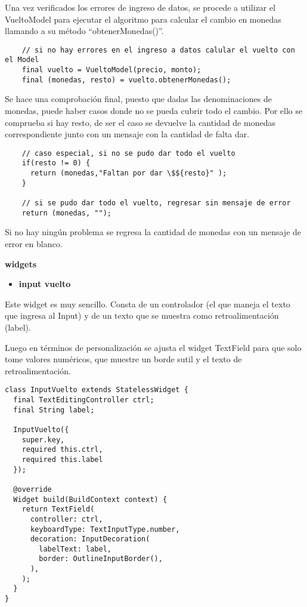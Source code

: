 Una vez verificados los errores de ingreso de datos, se procede a utilizar el VueltoModel para ejecutar el algoritmo para calcular el cambio en monedas llamando a su método “obtenerMonedas()”.

\begin{center}
\begin{lstlisting}
    // si no hay errores en el ingreso a datos calular el vuelto con el Model
    final vuelto = VueltoModel(precio, monto);
    final (monedas, resto) = vuelto.obtenerMonedas();
\end{lstlisting}
\end{center}

Se hace una comprobación final, puesto que dadas las denominaciones de monedas, puede haber casos donde no se pueda cubrir todo el cambio. Por ello se comprueba si hay resto, de ser el caso se devuelve la cantidad de monedas correspondiente junto con un mensaje con la cantidad de falta dar.

\begin{center}
\begin{lstlisting}
    // caso especial, si no se pudo dar todo el vuelto
    if(resto != 0) {
      return (monedas,"Faltan por dar \$${resto}" );
    }

    // si se pudo dar todo el vuelto, regresar sin mensaje de error
    return (monedas, "");
\end{lstlisting}
\end{center}

Si no hay ningún problema se regresa la cantidad de monedas con un mensaje de error en blanco.

\textbf{widgets}

\begin{itemize}
    \item \textbf{input vuelto}
\end{itemize}

Este widget es muy sencillo. Consta de un controlador (el que maneja el texto que ingresa al Input) y de un texto que se muestra como retroalimentación (label). 

Luego en términos de personalización se ajusta el widget TextField para que solo tome valores numéricos, que muestre un borde sutil y el texto de retroalimentación.

\begin{center}
\begin{lstlisting}
class InputVuelto extends StatelessWidget {
  final TextEditingController ctrl;
  final String label;

  InputVuelto({
    super.key,
    required this.ctrl,
    required this.label
  });

  @override
  Widget build(BuildContext context) {
    return TextField(
      controller: ctrl,
      keyboardType: TextInputType.number,
      decoration: InputDecoration(
        labelText: label,
        border: OutlineInputBorder(),
      ),
    );
  }
}
\end{lstlisting}
\end{center}

